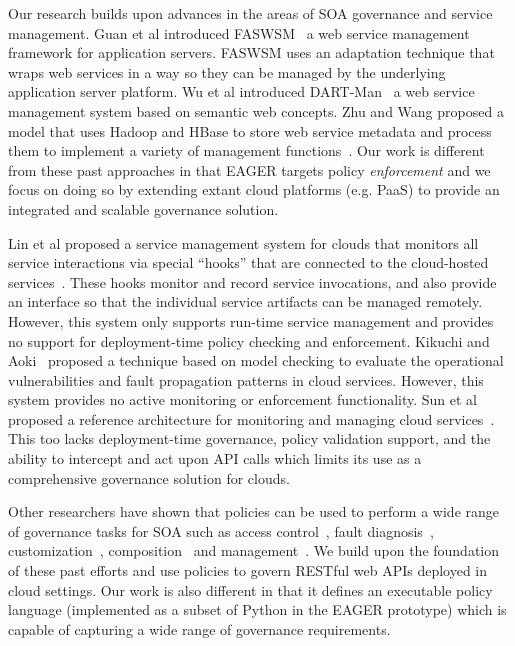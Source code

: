 Our research builds upon advances in the areas of SOA governance and
service management. 
Guan et al introduced FASWSM~\cite{1607141} a web service management
framework for application servers. FASWSM uses an adaptation technique that
wraps web services in a way so they can be managed by the underlying
application server platform. Wu et al introduced DART-Man~\cite{1504267} a web
service management system based on semantic web concepts.  Zhu and Wang
proposed a model that uses Hadoop and HBase to store web service metadata and
process them to implement a variety of management functions~\cite{5959326}.
Our work is different 
from these past approaches in that EAGER targets policy \textit{enforcement} 
and we focus on doing so by extending extant
cloud platforms (e.g. PaaS) to provide an integrated and scalable governance
solution.

Lin et al proposed a service management system for clouds that monitors all
service interactions via special ``hooks'' that are connected to the
cloud-hosted services~\cite{5616981}. These hooks monitor and record service
invocations, and also provide an interface so that the individual service
artifacts can be managed remotely. However, this system only supports run-time
service management and provides no support for deployment-time policy checking
and enforcement.  Kikuchi and Aoki~\cite{6525502} proposed a technique
based on model checking to evaluate the operational vulnerabilities and fault
propagation patterns in cloud services. However, this system provides no
active monitoring or enforcement functionality.
Sun et al proposed a reference architecture for monitoring and managing cloud
services~\cite{5579654}. This too lacks deployment-time governance, policy
validation support, and the ability to intercept and act upon API calls which
limits its use as a comprehensive governance solution for clouds.

Other researchers have shown that policies can be
used to perform a wide range of governance tasks for SOA such as access
control~\cite{4279630,5713420}, fault diagnosis~\cite{6154236},
customization~\cite{4027138},
composition~\cite{1592403,Erradi:2006:PMS:1515984.1515990} and
management~\cite{Suleiman:2009:IUM:1564601.1564730,6481237,4028029}. We build
upon the foundation of these past efforts and use policies to govern
RESTful web APIs deployed in cloud settings. 
Our work is also different in that it defines an executable
policy language (implemented as a subset of Python in the EAGER prototype)
which is capable of capturing
a wide range of governance requirements.


